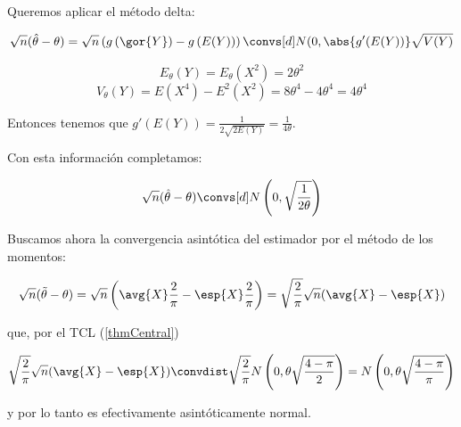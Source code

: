 \begin{problem}[5]
\spart

Queremos aplicar el método delta:

\[\sqrt{n}(\hat{\theta} - \theta) = \sqrt{n}\left(g\left(\gor{Y}\right) - g\left(E(Y)\right)\right) \convs[d]N(0,\abs{g'(E(Y))}\sqrt{V(Y)}\]

\[E_{\theta}(Y) = E_{\theta} (X^2) = 2\theta^2\]
\[V_{\theta}(Y) = E(X^4) - E^2(X^2) = 8\theta^4-4\theta^4 = 4\theta^4\]

Entonces tenemos que $g'(E(Y)) = \displaystyle \frac{1}{2\sqrt{2E(Y)}} = \frac{1}{4\theta}$.

Con esta información completamos:  

\[\sqrt{n}(\hat{\theta} - \theta) \convs[d] N\left(0,\sqrt{\frac{1}{2\theta}}\right)\]

Buscamos ahora la convergencia asintótica del estimador por el método de los momentos:

\[ \sqrt{n}(\tilde\theta-\theta) = \sqrt{n}\left(\avg{X}\frac{2}{\pi}  - \esp{X}\frac{2}{\pi}\right) = \sqrt{\frac{2}{\pi}}\sqrt{n}(\avg{X}-\esp{X}) \]

que, por el TCL (\ref{thmCentral})

\[ \sqrt{\frac{2}{\pi}}\sqrt{n}(\avg{X}-\esp{X})  \convdist  \sqrt{\frac{2}{\pi}}N\left(0,\theta\sqrt{\frac{4-\pi}{2}}\right) = N\left(0,\theta\sqrt{\frac{4-\pi}{\pi}}\right) \]

y por lo tanto es efectivamente asintóticamente normal.

\end{problem}



